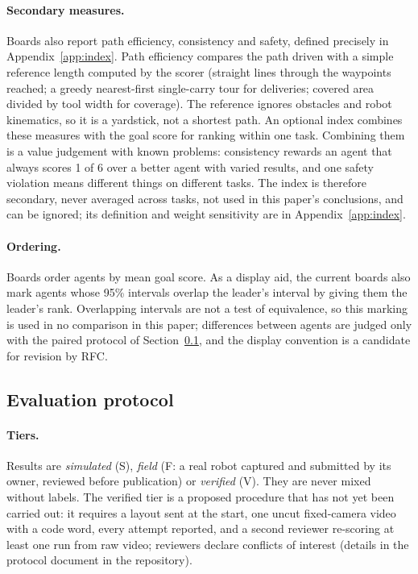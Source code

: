 \documentclass[11pt]{article}
\begin{document}
\paragraph{Secondary measures.} Boards also report path efficiency, consistency and safety, defined
precisely in Appendix~\ref{app:index}. Path efficiency compares the path driven with a simple
reference length computed by the scorer (straight lines through the waypoints reached; a greedy
nearest-first single-carry tour for deliveries; covered area divided by tool width for coverage). The
reference ignores obstacles and robot kinematics, so it is a yardstick, not a shortest path.
An optional index combines these measures with the goal score for ranking within one task. Combining
them is a value judgement with known problems: consistency rewards an agent that always scores 1 of 6
over a better agent with varied results, and one safety violation means different things on
different tasks. The index is therefore secondary, never averaged across tasks, not used in this
paper's conclusions, and can be ignored; its definition and weight sensitivity are in
Appendix~\ref{app:index}.

\paragraph{Ordering.} Boards order agents by mean goal score. As a display aid, the current boards
also mark agents whose 95\% intervals overlap the leader's interval by giving them the leader's rank.
Overlapping intervals are not a test of equivalence, so this marking is used in no comparison in this
paper; differences between agents are judged only with the paired protocol of
Section~\ref{sec:protocol}, and the display convention is a candidate for revision by RFC.

\subsection{Evaluation protocol}\label{sec:protocol}

\paragraph{Tiers.} Results are \emph{simulated} (S), \emph{field} (F: a real robot captured and
submitted by its owner, reviewed before publication) or \emph{verified} (V). They are never mixed
without labels. The verified tier is a proposed procedure that has not yet been carried out: it
requires a layout sent at the start, one uncut fixed-camera video with a code word, every attempt
reported, and a second reviewer re-scoring at least one run from raw video; reviewers declare
conflicts of interest (details in the protocol document in the repository).
\end{document}
